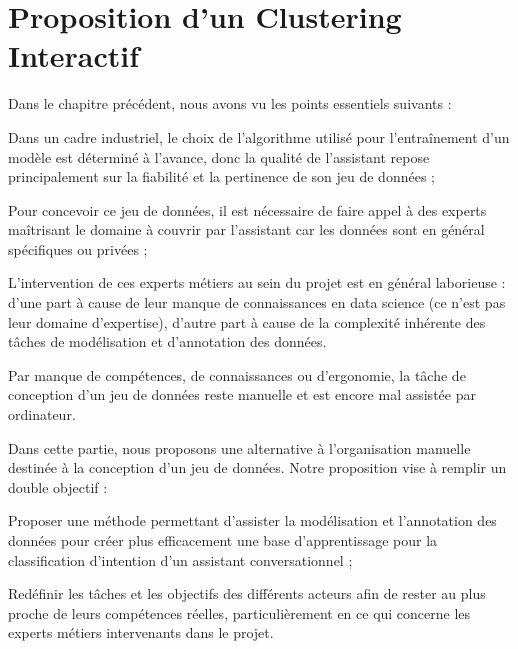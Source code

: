 \chapter{Proposition d'un Clustering Interactif}
    \label{chapter:3-CLUSTERING-INTERACTIF}
    
    Dans le chapitre précédent, nous avons vu les points essentiels suivants :
	\begin{leftBarImportantGreen}
		\begin{todolist}
			\item[\itemok] Dans un cadre industriel, le choix de l'algorithme utilisé pour l’entraînement d'un modèle est déterminé à l'avance, donc la qualité de l'assistant repose principalement sur la fiabilité et la pertinence de son jeu de données ;
			\item[\itemok] Pour concevoir ce jeu de données, il est nécessaire de faire appel à des experts maîtrisant le domaine à couvrir par l'assistant car les données sont en général spécifiques ou privées ;
			\item[\itemok] L'intervention de ces experts métiers au sein du projet est en général laborieuse :
			d'une part à cause de leur manque de connaissances en data science (ce n'est pas leur domaine d'expertise),
			d'autre part à cause de la complexité inhérente des tâches de modélisation et d'annotation des données.
			\item[\itemok] Par manque de compétences, de connaissances ou d'ergonomie, la tâche de conception d'un jeu de données reste manuelle et est encore mal assistée par ordinateur.
		\end{todolist}
	\end{leftBarImportantGreen}
	
	Dans cette partie, nous proposons une alternative à l'organisation manuelle destinée à la conception d'un jeu de données. Notre proposition vise à remplir un double objectif :
	\begin{leftBarImportantRed}
		\begin{todolist}
			\item Proposer une méthode permettant d'assister la modélisation et l'annotation des données pour créer plus efficacement une base d'apprentissage pour la classification d'intention d'un assistant conversationnel ;
			\item Redéfinir les tâches et les objectifs des différents acteurs afin de rester au plus proche de leurs compétences réelles, particulièrement en ce qui concerne les experts métiers intervenants dans le projet.
		\end{todolist}
	\end{leftBarImportantRed}

